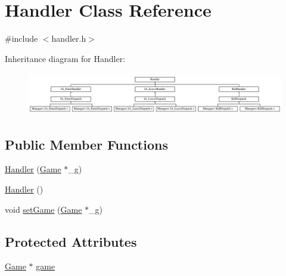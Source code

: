 \hypertarget{class_handler}{\section{Handler Class Reference}
\label{class_handler}
}


{\ttfamily \#include $<$handler.\-h$>$}

Inheritance diagram for Handler\-:\begin{figure}[H]
\begin{center}
\leavevmode
\includegraphics[height=1.885522cm]{class_handler}
\end{center}
\end{figure}
\subsection*{Public Member Functions}
\begin{DoxyCompactItemize}
\item 
\hyperlink{class_handler_a34e86cc5a32e5fe9b4675f16f7b77383}{Handler} (\hyperlink{class_game}{Game} $\ast$\-\_\-g)
\item 
\hyperlink{class_handler_a6eb353aae22778422bc71f6b00aad8be}{Handler} ()
\item 
void \hyperlink{class_handler_ac0ff81e19943c7c1c360dd5597e5b658}{set\-Game} (\hyperlink{class_game}{Game} $\ast$\-\_\-g)
\end{DoxyCompactItemize}
\subsection*{Protected Attributes}
\begin{DoxyCompactItemize}
\item 
\hyperlink{class_game}{Game} $\ast$ \hyperlink{class_handler_a1f0fad79bbada9ca4f5fd3e649a19808}{game}
\end{DoxyCompactItemize}


